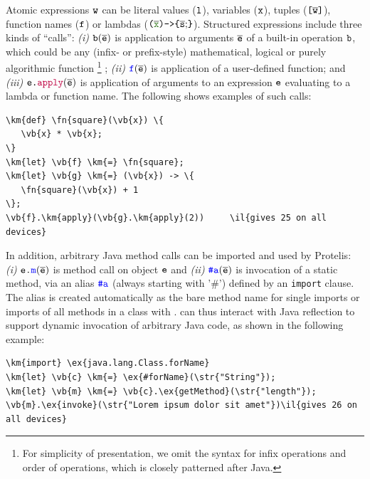 \documentclass[12pt,a4paper,twoside,openright]{book}
\begin{document}
Atomic expressions $\texttt{w}{}$ can be literal values ($\texttt{l}$), variables ($\texttt{x}$), tuples ($\texttt{[}\overline{\texttt{w}}\texttt{]}$), function names ($\texttt{f}$) or lambdas ($\lambdaK{\overline{\vb{\var}}}{\bodyK{\overline{\s};}}$).
%
Structured expressions include three kinds of ``calls'': \emph{(i)} $\texttt{b}(\overline{\texttt{e}})$ is application to arguments $\overline{\texttt{e}}$ of a built-in operation $\texttt{b}$, which could be any (infix- or prefix-style) mathematical, logical or purely algorithmic function
%
\footnote{For simplicity of presentation, we omit the syntax for infix operations and order of operations, which is closely patterned after Java.}
%
; \emph{(ii)} $\textcolor{blue}{\texttt{f}}(\overline{\texttt{e}})$ is application of a user-defined function; and \emph{(iii)} $\texttt{e}\texttt{.}\textcolor{purple}{\texttt{apply}}(\overline{\texttt{e}})$ is application of arguments to an expression $\texttt{e}$ evaluating to a lambda or function name.
%
The following shows examples of such calls:

\begin{Verbatim}[samepage=true, frame=single, commandchars=\\\{\}]
\km{def} \fn{square}(\vb{x}) \{
   \vb{x} * \vb{x};
\}
\km{let} \vb{f} \km{=} \fn{square};
\km{let} \vb{g} \km{=} (\vb{x}) -> \{
   \fn{square}(\vb{x}) + 1
\};
\vb{f}.\km{apply}(\vb{g}.\km{apply}(2))     \il{gives 25 on all devices}
\end{Verbatim}

In addition, arbitrary Java method calls can be imported and used by Protelis: \emph{(i)} $\texttt{e}\texttt{.}\textcolor{blue}{\texttt{m}}(\overline{\texttt{e}})$ is method call on object $\texttt{e}$ and \emph{(ii)} $\textcolor{blue}{\texttt{\#a}}(\overline{\texttt{e}})$ is invocation of a static method, via an alias $\textcolor{blue}{\texttt{\#a}}$ (always starting with '\#') defined by an {\tt import} clause.
%
The alias is created automatically as the bare method name for single imports or imports of all methods in a class with {\tt *}.
%
\protelis{} can thus interact with Java reflection to support dynamic invocation of arbitrary Java code, as shown in the following example:

\begin{Verbatim}[samepage=true, frame=single, commandchars=\\\{\}]
\km{import} \ex{java.lang.Class.forName}
\km{let} \vb{c} \km{=} \ex{#forName}(\str{"String"});
\km{let} \vb{m} \km{=} \vb{c}.\ex{getMethod}(\str{"length"});
\vb{m}.\ex{invoke}(\str{"Lorem ipsum dolor sit amet"})\il{gives 26 on all devices}
\end{Verbatim}

%
%
\end{document}
